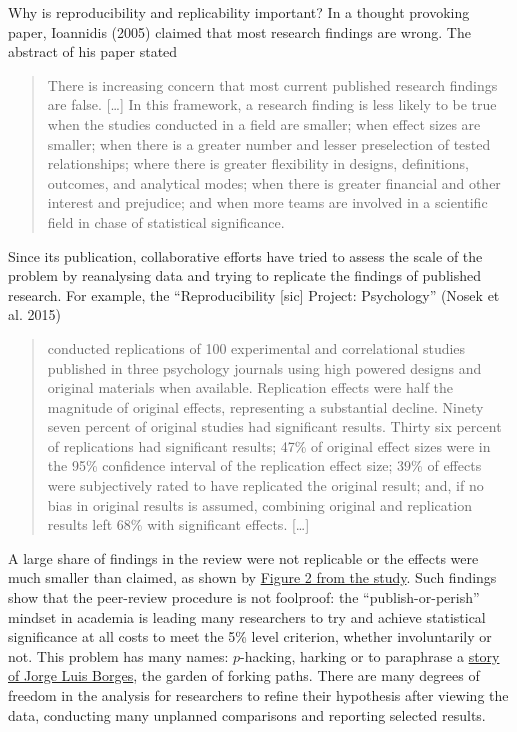 \documentclass[
  11pt,
  letterpaper,
]{scrbook}
\theoremstyle{definition}
\theoremstyle{remark}
\begin{document}
Why is reproducibility and replicability important? In a thought
provoking paper, Ioannidis (2005) claimed that most research findings
are wrong. The abstract of his paper stated

\begin{quote}
There is increasing concern that most current published research
findings are false. {[}\ldots{]} In this framework, a research finding
is less likely to be true when the studies conducted in a field are
smaller; when effect sizes are smaller; when there is a greater number
and lesser preselection of tested relationships; where there is greater
flexibility in designs, definitions, outcomes, and analytical modes;
when there is greater financial and other interest and prejudice; and
when more teams are involved in a scientific field in chase of
statistical significance.
\end{quote}

Since its publication, collaborative efforts have tried to assess the
scale of the problem by reanalysing data and trying to replicate the
findings of published research. For example, the ``Reproducibility
{[}sic{]} Project: Psychology'' (Nosek et al. 2015)

\begin{quote}
conducted replications of 100 experimental and correlational studies
published in three psychology journals using high powered designs and
original materials when available. Replication effects were half the
magnitude of original effects, representing a substantial decline.
Ninety seven percent of original studies had significant results. Thirty
six percent of replications had significant results; 47\% of original
effect sizes were in the 95\% confidence interval of the replication
effect size; 39\% of effects were subjectively rated to have replicated
the original result; and, if no bias in original results is assumed,
combining original and replication results left 68\% with significant
effects. {[}\ldots{]}
\end{quote}

A large share of findings in the review were not replicable or the
effects were much smaller than claimed, as shown by
\href{https://osf.io/447b3/}{Figure 2 from the study}. Such findings
show that the peer-review procedure is not foolproof: the
``publish-or-perish'' mindset in academia is leading many researchers to
try and achieve statistical significance at all costs to meet the 5\%
level criterion, whether involuntarily or not. This problem has many
names: \(p\)-hacking, harking or to paraphrase a
\href{https://en.wikipedia.org/wiki/The_Garden_of_Forking_Paths}{story
of Jorge Luis Borges}, the garden of forking paths. There are many
degrees of freedom in the analysis for researchers to refine their
hypothesis after viewing the data, conducting many unplanned comparisons
and reporting selected results.
\end{document}
